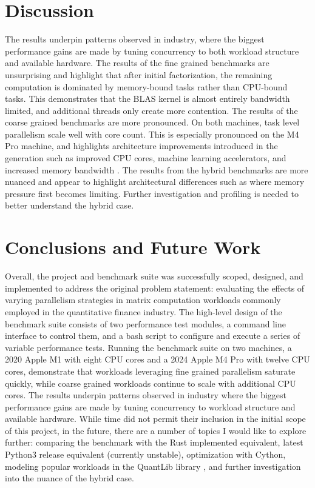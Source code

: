 \documentclass{article}
\begin{document}
\endgroup


\section{Discussion}
\label{sec:headings}
The results underpin patterns observed in industry, where the biggest performance gains are made by tuning concurrency to both workload structure and available hardware. The results of the fine grained benchmarks are unsurprising and highlight that after initial factorization, the remaining computation is dominated by memory-bound tasks rather than CPU-bound tasks. This demonstrates that the BLAS kernel is almost entirely bandwidth limited, and additional threads only create more contention. The results of the coarse grained benchmarks are more pronounced. On both machines, task level parallelism scale well with core count. This is especially pronounced on the M4 Pro machine, and highlights architecture improvements introduced in the generation such as improved CPU cores, machine learning accelerators, and increased memory bandwidth \cite{3}. The results from the hybrid benchmarks are more nuanced and appear to highlight architectural differences such as where memory pressure first becomes limiting. Further investigation and profiling is needed to better understand the hybrid case.  


\section{Conclusions and Future Work}
\label{sec:headings}
Overall, the project and benchmark suite was successfully scoped, designed, and implemented to address the original problem statement: evaluating the effects of varying parallelism strategies in matrix computation workloads commonly employed in the quantitative finance industry. The high-level design of the benchmark suite consists of two performance test modules, a command line interface to control them, and a bash script to configure and execute a series of variable performance tests. Running the benchmark suite on two machines, a 2020 Apple M1 with eight CPU cores and a 2024 Apple M4 Pro with twelve CPU cores, demonstrate that workloads leveraging fine grained parallelism saturate quickly, while coarse grained workloads continue to scale with additional CPU cores. The results underpin patterns observed in industry where the biggest performance gains are made by tuning concurrency to workload structure and available hardware. While time did not permit their inclusion in the initial scope of this project, in the future, there are a number of topics I would like to explore further: comparing the benchmark with the Rust implemented equivalent, latest Python3 release equivalent (currently unstable), optimization with Cython, modeling popular workloads in the QuantLib library \cite{4}, and further investigation into the nuance of the hybrid case. 

\clearpage           %
\begingroup
\raggedright        
  
    
\endgroup
\end{document}

